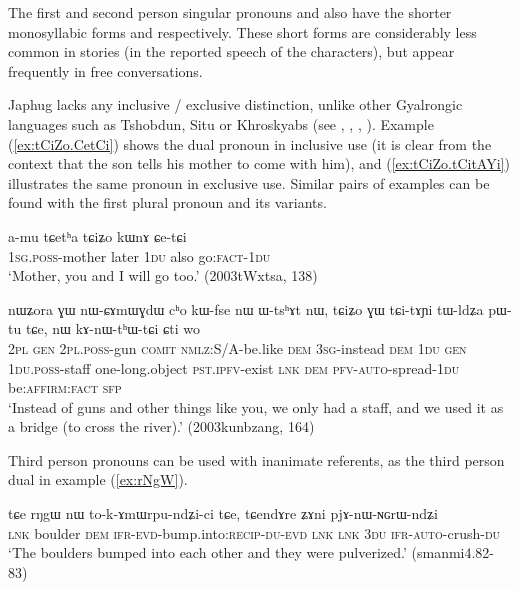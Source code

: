 The first and second person singular pronouns   and  also have the shorter monosyllabic forms  and  respectively. These short forms are considerably less common in stories (in the reported speech of the characters), but appear frequently in free conversations.

Japhug lacks any inclusive / exclusive distinction, unlike other Gyalrongic languages such as Tshobdun, Situ or Khroskyabs (see \citealt{jackson98morphology}, \citealt[177]{linxr93jiarongen}, \citealt[92]{prins16kyomkyo}, \citealt[170]{lai17khroskyabs}). Example  (\ref{ex:tCiZo.CetCi}) shows the dual pronoun  in inclusive use (it is clear from the context that the son tells his mother to come with him), and (\ref{ex:tCiZo.tCitAYi}) illustrates the same pronoun in exclusive use. Similar pairs of examples can be found with the first plural pronoun  and its variants.

\begin{exe}
\ex \label{ex:tCiZo.CetCi}
\gll a-mu tɕetʰa tɕiʑo kɯnɤ ɕe-tɕi \\
\textsc{1sg.poss}-mother later \textsc{1du} also go:\textsc{fact}-\textsc{1du} \\
\glt `Mother, you and I will go too.' (2003tWxtsa, 138)
\end{exe}

\begin{exe}
\ex \label{ex:tCiZo.tCitAYi}
\gll nɯʑora ɣɯ nɯ-ɕɤmɯɣdɯ cʰo kɯ-fse nɯ ɯ-tsʰɤt nɯ, tɕiʑo ɣɯ tɕi-tɤɲi tɯ-ldʑa pɯ-tu tɕe, nɯ kɤ-nɯ-tʰɯ-tɕi ɕti wo \\
\textsc{2pl} \textsc{gen} \textsc{2pl.poss}-gun \textsc{comit} \textsc{nmlz}:S/A-be.like \textsc{dem} \textsc{3sg}-instead \textsc{dem} \textsc{1du} \textsc{gen} \textsc{1du.poss}-staff one-long.object \textsc{pst.ipfv}-exist \textsc{lnk} \textsc{dem} \textsc{pfv}-\textsc{auto}-spread-\textsc{1du} be:\textsc{affirm}:\textsc{fact} \textsc{sfp} \\
\glt `Instead of guns and other things like you, we only had a staff, and we used it as a bridge (to cross the river).' (2003kunbzang, 164)
\end{exe}

Third person pronouns can be used with inanimate referents, as the third person dual  in example (\ref{ex:rNgW}).

\begin{exe}
\ex \label{ex:rNgW}
\gll tɕe rŋgɯ nɯ  to-k-ɤmɯrpu-ndʑi-ci tɕe, tɕendɤre ʑɤni pjɤ-nɯ-ɴɢrɯ-ndʑi   \\
\textsc{lnk} boulder \textsc{dem} \textsc{ifr-evd}-bump.into:\textsc{recip}-\textsc{du-evd} \textsc{lnk} \textsc{lnk} \textsc{3du} \textsc{ifr-auto}-crush-\textsc{du} \\
\glt `The boulders bumped into each other and they were pulverized.' (smanmi4.82-83)
\end{exe}

